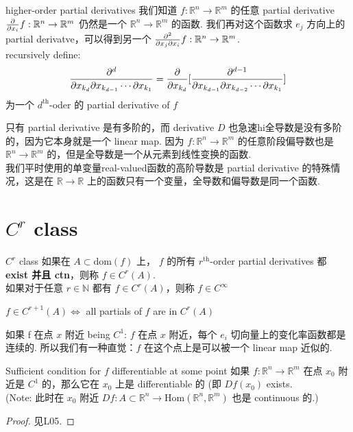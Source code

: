 \documentclass[lang=cn,11pt]{elegantbook}
\begin{document}
\begin{definition}{higher-order partial derivatives}
    我们知道 $f: \mathbb{R}^n \rightarrow \mathbb{R}^m$ 的任意 partial derivative ${\partial \over \partial x_i} f: \mathbb{R}^n \rightarrow \mathbb{R}^m$ 仍然是一个 $\mathbb{R}^n \rightarrow \mathbb{R}^m$ 的函数. 我们再对这个函数求 $e_j$ 方向上的 partial derivatve，可以得到另一个 ${\partial^2 \over \partial x_j \partial x_i} f: \mathbb{R}^n \rightarrow \mathbb{R}^m$.\\
    recursively define: 
    $$
    {\partial^d \over \partial x_{k_d}\partial x_{k_{d-1}}\cdots \partial x_{k_1}} = \frac{\partial }{\partial x_{k_d}}[{\partial^{d-1} \over \partial x_{k_{d-1}}\partial x_{k_{d-2}}\cdots \partial x_{k_1}}]
    $$
    为一个 $d^\text{th}$-oder 的 partial derivative of $f$
\end{definition}
\begin{remark}
    只有 partial derivative 是有多阶的，而 derivative $D$ 也急速hi全导数是没有多阶的，因为它本身就是一个 linear map. 因为 $f: \mathbb{R}^n \rightarrow \mathbb{R}^m$ 的任意阶段偏导数也是 $\mathbb{R}^n \rightarrow \mathbb{R}^m$ 的，但是全导数是一个从元素到线性变换的函数.\\
    我们平时使用的单变量real-valued函数的高阶导数是 partial derivative 的特殊情况，这是在 $\mathbb{R} \rightarrow \mathbb{R}$ 上的函数只有一个变量，全导数和偏导数是同一个函数.
\end{remark}

\section{$C^r$ class}
\begin{definition}{$C^r$ class}
    如果在 $A \subset \text{dom}(f)$ 上， $f$ 的所有 $r^\text{th}$-order partial derivatives 都 \textbf{exist 并且 ctn}，则称 $f \in C^r(A)$.
    \\如果对于任意 $r \in \mathbb{N}$ 都有 $f \in C^r(A)$，则称 $f \in C^{\infty}$
\end{definition}


\begin{remark}
    $f \in C^{r+1}(A) \Leftrightarrow $ all partials of $f$ are in $C^r(A)$
\end{remark}



    如果 f 在点 $x$ 附近 being $C^1$: $f$ 在点 $x$ 附近，每个 $e_i$ 切向量上的变化率函数都是连续的. 所以我们有一种直觉：$f$ 在这个点上是可以被一个 linear map 近似的.

\begin{theorem}{Sufficient condition for $f$ differentiable at some point}
    如果 $f: \mathbb{R}^n \rightarrow \mathbb{R}^m$ 在点 $x_0$ 附近是 $C^1$ 的，那么它在 $x_0$ 上是 differentiable 的 (即 $Df(x_0)$ exists.\\
    (Note: 此时在 $x_0$ 附近 $Df: A \subset \mathbb{R}^n \rightarrow \text{Hom}(\mathbb{R}^n, \mathbb{R}^m) $ 也是 continuous 的.)
\end{theorem}
\begin{proof}
见L05.
\end{proof}
\end{document}
